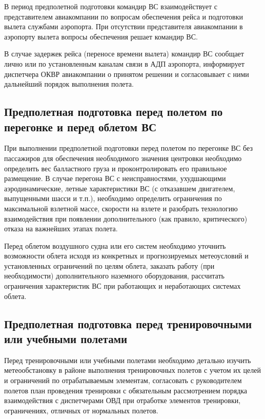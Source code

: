 В период предполетной подготовки командир ВС взаимодействует с представителем авиакомпании по вопросам обеспечения рейса и подготовки вылета службами аэропорта. При отсутствии представителя авиакомпании в аэропорту вылета вопросы обеспечения решает командир ВС.

В случае задержек рейса (переносе времени вылета) командир ВС сообщает лично или по установленным каналам связи в АДП аэропорта, информирует диспетчера ОКВР авиакомпании о принятом решении и согласовывает с ними дальнейший порядок выполнения полета.

\subsection{Предполетная подготовка перед полетом по перегонке и перед облетом ВС}
\setcounter{subsect}{1}

При выполнении предполетной подготовки перед полетом по перегонке ВС без пассажиров для обеспечения необходимого значения центровки необходимо определить вес балластного груза и проконтролировать его правильное размещение. В случае перегона ВС с неисправностями, ухудшающими аэродинамические, летные характеристики ВС (с отказавшем двигателем, выпущенными шасси и т.п.), необходимо определить ограничения по максимальной взлетной массе, скорости на взлете и разобрать технологию взаимодействия при появлении дополнительного (как правило, критического) отказа на важнейших этапах полета.

Перед облетом воздушного судна или его систем необходимо уточнить возможности облета исходя из конкретных и прогнозируемых метеоусловий и установленных ограничений по целям облета, заказать работу (при необходимости) дополнительного наземного оборудования, рассчитать ограничения характеристик ВС при работающих и неработающих системах облета.

\subsection{Предполетная подготовка перед тренировочными или учебными полетами}
\setcounter{subsect}{1}

Перед тренировочными или учебными полетами необходимо детально изучить метеообстановку в районе выполнения тренировочных полетов с учетом их целей и ограничений по отрабатываемым элементам, согласовать с руководителем полетов план проведения тренировки с обязательным рассмотрением порядка взаимодействия с диспетчерами ОВД при отработке элементов тренировки, ограничениях, отличных от нормальных полетов.

